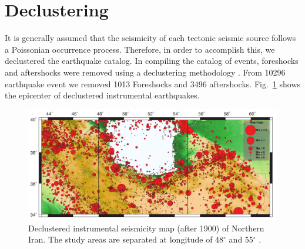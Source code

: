 \section{Declustering}

It is generally assumed that the seismicity of each tectonic seismic source follows a Poissonian occurrence process. Therefore, in order to accomplish this, we declustered the earthquake catalog. In compiling the catalog of events, foreshocks and aftershocks were removed using a declustering methodology \citep{Gardner1974}. From 10296 earthquake event we removed 1013 Foreshocks and 3496 aftershocks. Fig.~\ref{fig:instrumental} shows the epicenter of declustered instrumental  earthquakes.

\begin{figure} [H]
\centering
\includegraphics[scale=0.8]{figures/pdf/Figure3.pdf} 
\caption{Declustered instrumental seismicity map (after 1900) of Northern Iran. The study areas are separated at longitude of 48$^{\circ}$ and 55$^{\circ}$ . } 
\label{fig:instrumental}
\end{figure}




